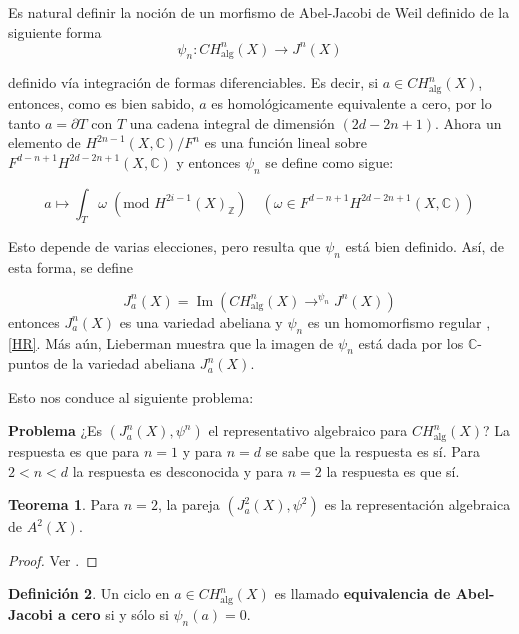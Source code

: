 \documentclass[10pt]{amsart}
\theoremstyle{definition}
\newtheorem{definition}{Definici\'on}[section]
\newtheorem{theorem}[definition]{Teorema}
\theoremstyle{remark}
\theoremstyle{definition}
\begin{document}
Es natural definir la noción de un morfismo de Abel-Jacobi de Weil definido de la siguiente forma
\begin{equation*}
\psi_{n}: CH^{n}_{\mathrm{alg}}(X) \rightarrow J^{n}(X)
\end{equation*}

definido vía integración de formas diferenciables. Es decir, si $a \in CH^{n}_{\mathrm{alg}}(X)$, entonces, como es bien sabido, $a$ es homológicamente equivalente a cero, por lo tanto \(a = \partial T\) con $T$ una cadena integral de dimensión $(2d-2n+1)$. Ahora un elemento de \(H^{2n-1}(X, \mathbb{C})/F^n\) es una función lineal sobre \(F^{d-n+1}H^{2d-2n+1}(X, \mathbb{C})\) y entonces $\psi_{n}$ se define como sigue:

\[
a \mapsto \int_T \omega \; (\text{mod } H^{2i-1}(X)_{\mathbb{Z}}) \quad (\omega \in F^{d-n+1}H^{2d-2n+1}(X, \mathbb{C}))
\]

Esto depende de varias elecciones, pero resulta que \(\psi_{n}\) está bien definido. Así, de esta forma, se define

\begin{equation*}
J^{n}_{a}(X)=\operatorname{Im}(CH^{n}_{\mathrm{alg}}(X) \rightarrow^{\psi_{n}} J^{n}(X))
\end{equation*}
entonces $J^{n}_{a}(X)$ es una variedad abeliana y $\psi_{n}$ es un homomorfismo regular \cite[Thm. 6.5(i)]{Lie68}, \ref{HR}. Más aún, Lieberman muestra \cite[Thm. 6.5(iii)]{Lie68} que la imagen de $\psi_{n}$ está dada por los $\mathbb{C}$-puntos de la variedad abeliana $J_{a}^{n}(X)$.

Esto nos conduce al siguiente problema:


\textbf{Problema} ¿Es $(J^{n}_{a}(X), \psi^{n})$ el representativo algebraico para $CH^{n}_{\mathrm{alg}}(X)$?
La respuesta es que para $n=1$ y para $n=d$ se sabe que la respuesta es sí. Para $2<n<d$ la respuesta es desconocida y para $n=2$ la respuesta es que sí.


\begin{theorem}\label{TeoC}
Para $n=2$, la pareja $(J^{2}_{a}(X),\psi^{2})$ es la representación algebraica de $A^{2}(X)$.
\end{theorem}

\begin{proof}
Ver \cite[Thm. 1.11.1]{Mur85}.
\end{proof}

\begin{definition}
Un ciclo en $a \in CH^{n}_{\mathrm{alg}}(X)$ es llamado \textbf{equivalencia de Abel-Jacobi a cero} si y sólo si $\psi_{n}(a)=0$.
\end{definition}
\end{document}
